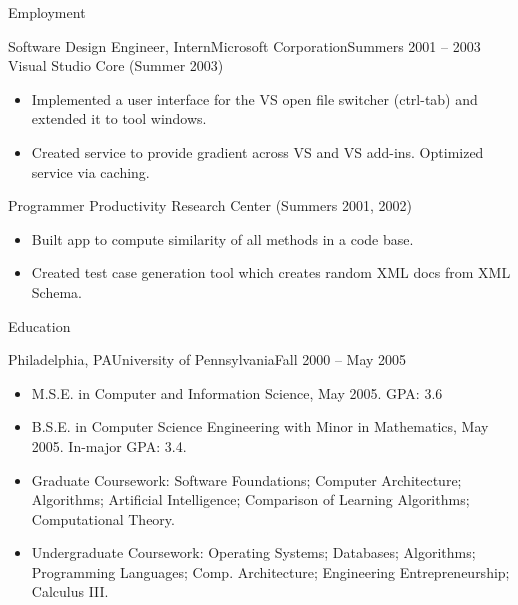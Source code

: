 \documentclass[]{mcdowellcv_updated}
\begin{document}
\begin{cvsection}{Employment}
		\begin{cvsubsection}{Software Design Engineer, Intern}{Microsoft Corporation}{Summers 2001 -- 2003}
			Visual Studio Core (Summer 2003)		
			\begin{itemize}
				\item Implemented a user interface for the VS open file switcher (ctrl-tab) and extended it to tool windows.
				\item Created service to provide gradient across VS and VS add-ins. Optimized service via caching.
			\end{itemize}
			Programmer Productivity Research Center (Summers 2001, 2002)
			\begin{itemize}
				\item Built app to compute similarity of all methods in a code base. 
				\item Created test case generation tool which creates random XML docs from XML Schema.
			\end{itemize}
		\end{cvsubsection}
	\end{cvsection}
	
	\begin{cvsection}{Education}
		\begin{cvsubsection}{Philadelphia, PA}{University of Pennsylvania}{Fall 2000 -- May 2005}
			\begin{itemize}
				\item M.S.E. in Computer and Information Science, May 2005. GPA: 3.6
				\item B.S.E. in Computer Science Engineering with Minor in Mathematics, May 2005.  In-major GPA: 3.4.
				\item Graduate Coursework: Software Foundations; Computer Architecture; Algorithms; Artificial Intelligence; Comparison of Learning Algorithms; Computational Theory.
				\item Undergraduate Coursework: Operating Systems; Databases; Algorithms; Programming Languages; Comp. Architecture; Engineering Entrepreneurship; Calculus III.
			\end{itemize}
		\end{cvsubsection}
	\end{cvsection}
	
\end{document}
